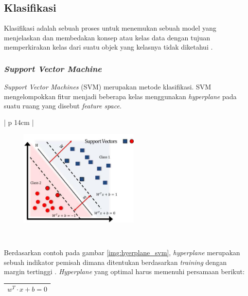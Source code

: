 \subsection{Klasifikasi}
Klasifikasi adalah sebuah proses untuk menemukan sebuah model yang menjelaskan dan membedakan konsep atau kelas data dengan tujuan memperkirakan kelas dari suatu objek yang kelasnya tidak diketahui \cite{steinwart}. 
\\ 

\subsubsection{\textit{Support Vector Machine}}
\textit{Support Vector Machines} (SVM) merupakan metode klasifikasi. SVM mengelompokkan fitur menjadi beberapa kelas menggunakan \textit{hyperplane} pada suatu ruang yang disebut \textit{feature space}.

\begin{table}[H]
	\small
	\begin{adjustbox}{width=1\textwidth}
		\begin{tabular}{| p {14cm} |}
			\hline
			\begin{figure}[H]
				\centering
				\includegraphics[width=6cm]{images/svm.jpg}
			\end{figure} \\
			\hline
		\end{tabular}
	\end{adjustbox}
	\label{img:hyerplane_svm}
\end{table}
Berdasarkan contoh pada gambar \ref{img:hyerplane_svm}, \textit{hyperplane} merupakan sebuah indikator pemisah dimana ditentukan berdasarkan \textit{training} dengan margin tertinggi \cite{steinwart}. \textit{Hyperplane} yang optimal harus memenuhi persamaan berikut:
\begin{table}[H]
	\small
	\begin{adjustbox}{width=1\textwidth}
		\begin{tabular}{|p{13.55cm}|}
			\hline
			\begin{equation} 
			\label{eqn:hiperplane}
			w^T \cdot x + b = 0
			\end{equation}\\
			\hline
		\end{tabular}
	\end{adjustbox}
\end{table}

